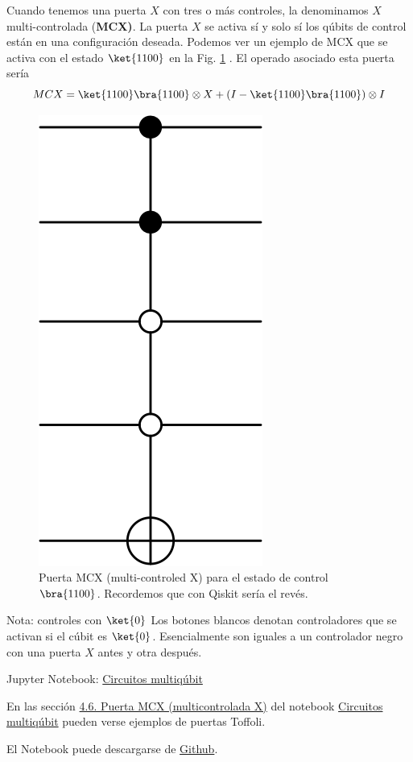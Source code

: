 \documentclass[a4paper,11pt]{book} %
\numberwithin{equation}{chapter}
\begin{document}
Cuando tenemos una puerta $X$ con tres o más controles, la denominamos $X$ multi-controlada (\textbf{MCX)}. La puerta $X$ se activa sí y solo sí los qúbits de control están en una configuración deseada. Podemos ver un ejemplo de MCX que se activa con el estado $\ket{1100}$ en la Fig. \ref{Fig_multiqubit_MCX_gate}  . El operado asociado esta puerta sería
\begin{equation}
MCX = \ket{1100}  \bra{1100}\otimes X + (I-\ket{1100}\bra{1100}) \otimes I
\end{equation}

	\begin{figure}[H]
	\centering 
	\includegraphics[width=0.1\linewidth]{Figuras/Fig_multiqubit_MCX_gate.png}
	\caption{Puerta MCX (multi-controled X) para el estado de control $\bra{1100}$. Recordemos que con Qiskit sería el revés.}
	\label{Fig_multiqubit_MCX_gate}
	\end{figure}

	\begin{mybox_blue}{Nota: controles con $\ket{0}$}
	Los botones blancos denotan controladores que se activan si el cúbit es $\ket{0}$. Esencialmente son iguales 
	a un controlador negro con una puerta $X$ antes y otra después.
	\end{mybox_blue}

    \begin{mybox_orange}{Jupyter Notebook: \href{https://www.scbi.uma.es/web/wp-content/uploads/Jupyterbook/CICC_UMA/Notebooks/html/docs/Part_01/Chapter_04-Circuitos_Multiqubits_myst.html}{Circuitos multiqúbit}}
	
	En las sección \href{https://www.scbi.uma.es/web/wp-content/uploads/Jupyterbook/CICC_UMA/Notebooks/html/docs/Part_01/Chapter_04-Circuitos_Multiqubits_myst.html#puerta-mcx-multicontrolada-x}{4.6. Puerta MCX (multicontrolada X)} del notebook \href{https://www.scbi.uma.es/web/wp-content/uploads/Jupyterbook/CICC_UMA/Notebooks/html/docs/Part_01/Chapter_04-Circuitos_Multiqubits_myst.html}{Circuitos multiqúbit} pueden verse ejemplos de puertas Toffoli.
	
	El Notebook puede descargarse de \href{https://github.com/davidcb98/CICC_UMA/blob/master/Notebooks/Part_01/Chapter_04-Circuitos_Multiqubits.ipynb}{Github}.
	\end{mybox_orange}
\end{document}
